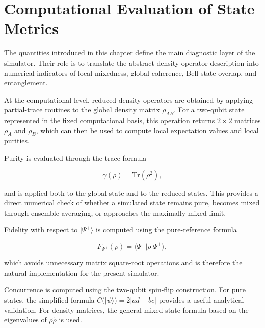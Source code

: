 
\section{Computational Evaluation of State Metrics}

The quantities introduced in this chapter define the main diagnostic layer of the simulator. Their role is to translate the abstract density-operator description into numerical indicators of local mixedness, global coherence, Bell-state overlap, and entanglement.

\medskip

At the computational level, reduced density operators are obtained by applying partial-trace routines to the global density matrix \( \rho_{AB} \). For a two-qubit state represented in the fixed computational basis, this operation returns \( 2 \times 2 \) matrices \( \rho_A \) and \( \rho_B \), which can then be used to compute local expectation values and local purities.

\medskip

Purity is evaluated through the trace formula

\[
\gamma(\rho)
=
\mathrm{Tr}(\rho^2),
\]

and is applied both to the global state and to the reduced states. This provides a direct numerical check of whether a simulated state remains pure, becomes mixed through ensemble averaging, or approaches the maximally mixed limit.

\medskip

Fidelity with respect to \( |\Psi^+\rangle \) is computed using the pure-reference formula

\[
F_{\Psi^+}(\rho)
=
\langle \Psi^+|\rho|\Psi^+\rangle,
\]

which avoids unnecessary matrix square-root operations and is therefore the natural implementation for the present simulator.

\medskip

Concurrence is computed using the two-qubit spin-flip construction. For pure states, the simplified formula \( C(|\psi\rangle)=2|ad-bc| \) provides a useful analytical validation. For density matrices, the general mixed-state formula based on the eigenvalues of \( \rho\tilde{\rho} \) is used.

\medskip

